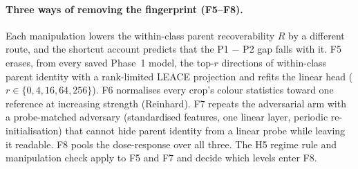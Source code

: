 \paragraph{Three ways of removing the fingerprint (F5--F8).} Each manipulation lowers the
within-class parent recoverability $R$ by a different route, and the shortcut account predicts
that the P1 $-$ P2 gap falls with it. F5 erases, from every saved Phase~1 model, the top-$r$
directions of within-class parent identity with a rank-limited LEACE projection
\citep{belrose2023leace} and refits the linear head ($r\in\{0,4,16,64,256\}$). F6 normalises every
crop's colour statistics toward one reference at increasing strength (Reinhard). F7 repeats the
adversarial arm with a probe-matched adversary (standardised features, one linear layer,
periodic re-initialisation) that cannot hide parent identity from a linear probe while leaving it
readable. F8 pools the dose-response over all three. The H5 regime rule and manipulation check
apply to F5 and F7 and decide which levels enter F8.
